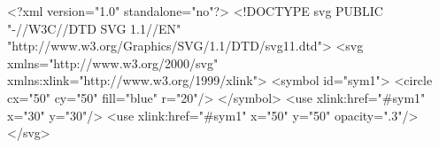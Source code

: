 <?xml version="1.0" standalone="no"?>
<!DOCTYPE svg PUBLIC "-//W3C//DTD SVG 1.1//EN" 
  "http://www.w3.org/Graphics/SVG/1.1/DTD/svg11.dtd">
<svg  xmlns="http://www.w3.org/2000/svg" 
 xmlns:xlink="http://www.w3.org/1999/xlink">
<symbol id="sym1">
    <circle cx="50" cy="50" fill="blue" r="20"/>
</symbol>
<use xlink:href="#sym1" x="30" y="30"/>
<use xlink:href="#sym1" x="50" y="50" opacity=".3"/>     
</svg>